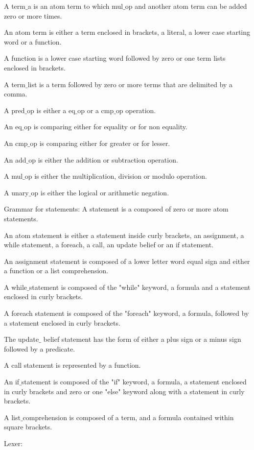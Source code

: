 \documentclass[a4paper,12pt,oneside,fleqn]{book} %
\theoremstyle{plain}
\theoremstyle{definition}
\theoremstyle{remark}
\begin{document}
A term$\_$a is an atom term to which mul$\_$op and another atom
term can be added zero or more times.

An atom term is either a term enclosed in brackets, a literal, a lower case
starting word or a function.

A function is a lower case starting word followed by zero or one term lists
enclosed in brackets.

A term$\_$list is a term followed by zero or more terms that are delimited
by a comma.

A pred$\_$op is either a eq$\_$op or a cmp$\_$op operation.

An eq$\_$op is comparing either for equality or for non equality.

An cmp$\_$op is comparing either for greater or for lesser.

An add$\_$op is either the addition or subtraction operation.

A mul$\_$op is either the multiplication, division or modulo operation.


A unary$\_$op is either the logical or arithmetic negation.

Grammar for statements:
A statement is a composed of zero or more atom statements.


An atom statement is either a statement inside curly brackets, an
assignment, a while statement, a foreach, a call, an update belief or an if
statement.

An assignment statement is composed of a lower letter word equal sign and
either a function or a list comprehension.

A while$\_$statement is composed of the "while" keyword, a formula and a
statement enclosed in curly brackets.

A foreach statement is composed of the "foreach" keyword, a formula,
followed by a statement enclosed in curly brackets.

The update$\_$ belief statement has the form of either a plus sign or a
minus sign followed by a predicate.

A call statement is represented by a function.

An if$\_$statement is composed of the "if" keyword, a formula, a statement
enclosed in curly brackets and zero or one "else" keyword along with a
statement in curly brackets.

A list$\_$comprehension is composed of a term, and a formula contained
within square brackets.

Lexer:
\end{document}
